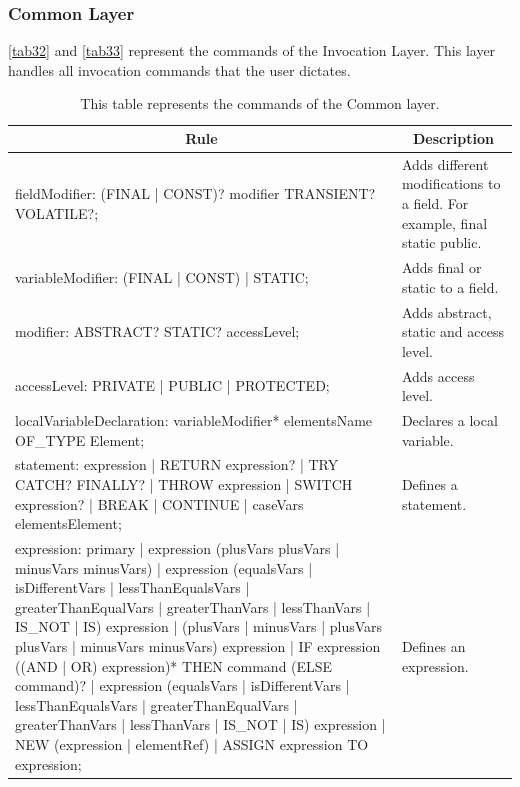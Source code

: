 \subsubsection{Common Layer}
\autoref{tab32} and \autoref{tab33} represent the commands of the Invocation Layer.  This layer handles all invocation commands that the user dictates.

\begin{table}[H]
	\centering
	\begin{tabular}{|p{8cm}|p{7cm}|}
		\hline
		\multicolumn{1}{|c|}{{\bf Rule}}                                                                                                                                                                                                                                                                                                                                                                                                      & \multicolumn{1}{c|}{{\bf Description}} \\ \hline
		fieldModifier: (FINAL | CONST)? modifier TRANSIENT? VOLATILE?; & Adds different modifications to a field. For example, final static public. \\ \hline
		variableModifier: (FINAL | CONST) | STATIC; & Adds final or static to a field. \\ \hline
		modifier: ABSTRACT? STATIC? accessLevel; & Adds abstract, static and access level. \\ \hline
		accessLevel: PRIVATE | PUBLIC | PROTECTED; & Adds access level. \\ \hline
		localVariableDeclaration: variableModifier* elementsName OF\_TYPE Element; & Declares a local variable. \\ \hline
		statement: expression | RETURN expression? | TRY CATCH? FINALLY? | THROW expression | SWITCH expression? | BREAK | CONTINUE | caseVars elementsElement; & Defines a statement. \\ \hline
		expression: primary | expression (plusVars plusVars | minusVars minusVars) | expression (equalsVars | isDifferentVars | lessThanEqualsVars | greaterThanEqualVars | greaterThanVars | lessThanVars | IS\_NOT | IS) expression | (plusVars | minusVars | plusVars plusVars | minusVars minusVars) expression | IF expression ((AND | OR) expression)* THEN command (ELSE command)? | expression (equalsVars | isDifferentVars | lessThanEqualsVars | greaterThanEqualVars | greaterThanVars | lessThanVars | IS\_NOT | IS) expression | NEW (expression | elementRef) | ASSIGN expression TO expression; & Defines an expression. \\ \hline
	\end{tabular}
	\caption{This table represents the commands of the Common layer.}
	\label{tab32}
\end{table}


